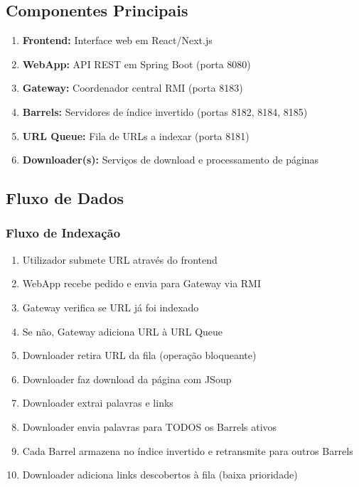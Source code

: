 \documentclass[12pt,a4paper]{article}
\begin{document}
\subsection{Componentes Principais}

\begin{enumerate}
    \item \textbf{Frontend:} Interface web em React/Next.js
    \item \textbf{WebApp:} API REST em Spring Boot (porta 8080)
    \item \textbf{Gateway:} Coordenador central RMI (porta 8183)
    \item \textbf{Barrels:} Servidores de índice invertido (portas 8182, 8184, 8185)
    \item \textbf{URL Queue:} Fila de URLs a indexar (porta 8181)
    \item \textbf{Downloader(s):} Serviços de download e processamento de páginas
\end{enumerate}

\subsection{Fluxo de Dados}

\subsubsection{Fluxo de Indexação}
\begin{enumerate}
    \item Utilizador submete URL através do frontend
    \item WebApp recebe pedido e envia para Gateway via RMI
    \item Gateway verifica se URL já foi indexado
    \item Se não, Gateway adiciona URL à URL Queue
    \item Downloader retira URL da fila (operação bloqueante)
    \item Downloader faz download da página com JSoup
    \item Downloader extrai palavras e links
    \item Downloader envia palavras para TODOS os Barrels ativos
    \item Cada Barrel armazena no índice invertido e retransmite para outros Barrels
    \item Downloader adiciona links descobertos à fila (baixa prioridade)
\end{enumerate}
\end{document}
